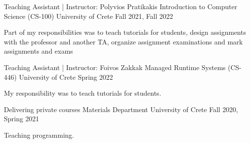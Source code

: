 


\begin{cventries}

  \cventry
    {Teaching Assistant | Instructor: Polyvios Pratikakis} %
    {Introduction to Computer Science (CS-100)} %
    {University of Crete} %
    {Fall 2021, Fall 2022} %
    {
      \begin{cvitems} %
        \item{Part of my responsibilities was to teach tutorials for
            students, design assignments with the professor and
              another TA, organize assignment examinations
	      and mark assignments and exams}
      \end{cvitems}
    }

  \cventry
    {Teaching Assistant | Instructor: Foivos Zakkak} %
    {Managed Runtime Systems (CS-446)} %
    {University of Crete} %
    {Spring 2022} %
    {
      \begin{cvitems} %
        \item{My responsibility was to teach tutorials for
            students.}
      \end{cvitems}
    }


  \cventry
    {Delivering private courses} %
    {Materials Department} %
    {University of Crete} %
    {Fall 2020, Spring 2021} %
    {
      \begin{cvitems}
        \item{Teaching programming.}
      \end{cvitems}
    }

\end{cventries}
